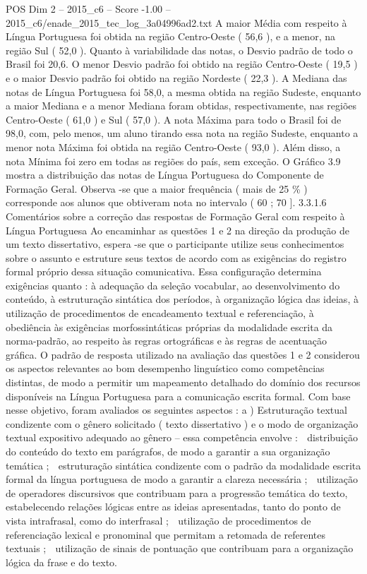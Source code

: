 \begin{textsample}{POS Dim 2 – 2015\_c6 – Score -1.00 – 2015\_c6/enade\_2015\_tec\_log\_3a04996ad2.txt}
A maior Média com respeito à Língua Portuguesa foi obtida na região Centro-Oeste ( 56,6 ), e a menor, na região Sul ( 52,0 ).
Quanto à variabilidade das notas, o Desvio padrão de todo o Brasil foi 20,6.
O menor Desvio padrão foi obtido na região Centro-Oeste ( 19,5 ) e o maior Desvio padrão foi obtido na região Nordeste ( 22,3 ).
A Mediana das notas de Língua Portuguesa foi 58,0, a mesma obtida na região Sudeste, enquanto a maior Mediana e a menor Mediana foram obtidas, respectivamente, nas regiões Centro-Oeste ( 61,0 ) e Sul ( 57,0 ).
A nota Máxima para todo o Brasil foi de 98,0, com, pelo menos, um aluno tirando essa nota na região Sudeste, enquanto a menor nota Máxima foi obtida na região Centro-Oeste ( 93,0 ).
Além disso, a nota Mínima foi zero em todas as regiões do país, sem exceção.
O Gráfico 3.9 mostra a distribuição das notas de Língua Portuguesa do Componente de Formação Geral.
Observa -se que a maior frequência ( mais de 25 \% ) corresponde aos alunos que obtiveram nota no intervalo ( 60 ; 70 ]. 3.3.1.6 Comentários sobre a correção das respostas de Formação Geral com respeito à Língua Portuguesa Ao encaminhar as questões 1 e 2 na direção da produção de um texto dissertativo, espera -se que o participante utilize seus conhecimentos sobre o assunto e estruture seus textos de acordo com as exigências do registro formal próprio dessa situação comunicativa.
Essa configuração determina exigências quanto : à adequação da seleção vocabular, ao desenvolvimento do conteúdo, à estruturação sintática dos períodos, à organização lógica das ideias, à utilização de procedimentos de encadeamento textual e referenciação, à obediência às exigências morfossintáticas próprias da modalidade escrita da norma-padrão, ao respeito às regras ortográficas e às regras de acentuação gráfica.
O padrão de resposta utilizado na avaliação das questões 1 e 2 considerou os aspectos relevantes ao bom desempenho linguístico como competências distintas, de modo a permitir um mapeamento detalhado do domínio dos recursos disponíveis na Língua Portuguesa para a comunicação escrita formal.
Com base nesse objetivo, foram avaliados os seguintes aspectos : a ) Estruturação textual condizente com o gênero solicitado ( texto dissertativo ) e o modo de organização textual expositivo adequado ao gênero – essa competência envolve :  distribuição do conteúdo do texto em parágrafos, de modo a garantir a sua organização temática ;  estruturação sintática condizente com o padrão da modalidade escrita formal da língua portuguesa de modo a garantir a clareza necessária ;  utilização de operadores discursivos que contribuam para a progressão temática do texto, estabelecendo relações lógicas entre as ideias apresentadas, tanto do ponto de vista intrafrasal, como do interfrasal ;  utilização de procedimentos de referenciação lexical e pronominal que permitam a retomada de referentes textuais ;  utilização de sinais de pontuação que contribuam para a organização lógica da frase e do texto.

\end{textsample}
